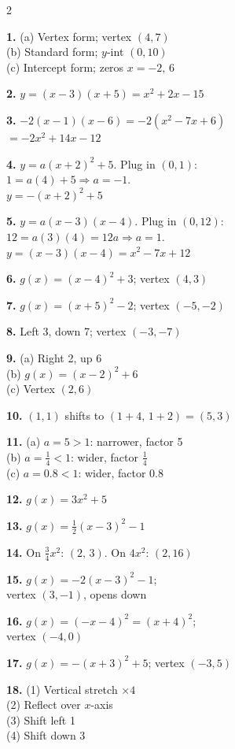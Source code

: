\documentclass[11pt]{article}
\begin{document}
\begin{multicols}{2}

\textbf{1.}
(a) Vertex form; vertex $(4,7)$\\
(b) Standard form; $y$-int $(0,10)$\\
(c) Intercept form; zeros $x=-2,\,6$

\medskip
\textbf{2.} $y=(x-3)(x+5)=x^2+2x-15$

\medskip
\textbf{3.} $-2(x-1)(x-6)=-2(x^2-7x+6)$\\
$= -2x^2+14x-12$

\medskip
\textbf{4.} $y=a(x+2)^2+5$. Plug in $(0,1)$:\\
$1=a(4)+5 \Rightarrow a=-1$.\\
$y=-(x+2)^2+5$

\medskip
\textbf{5.} $y=a(x-3)(x-4)$. Plug in $(0,12)$:\\
$12=a(3)(4)=12a \Rightarrow a=1$.\\
$y=(x-3)(x-4)=x^2-7x+12$

\medskip
\textbf{6.} $g(x)=(x-4)^2+3$; vertex $(4,3)$

\medskip
\textbf{7.} $g(x)=(x+5)^2-2$; vertex $(-5,-2)$

\medskip
\textbf{8.} Left 3, down 7; vertex $(-3,-7)$

\medskip
\textbf{9.} (a) Right 2, up 6\\
(b) $g(x)=(x-2)^2+6$\\
(c) Vertex $(2,6)$

\medskip
\textbf{10.} $(1,1)$ shifts to $(1+4,\,1+2)=(5,3)$

\medskip
\textbf{11.}
(a) $a=5>1$: narrower, factor 5\\
(b) $a=\frac{1}{4}<1$: wider, factor $\frac{1}{4}$\\
(c) $a=0.8<1$: wider, factor $0.8$

\medskip
\textbf{12.} $g(x)=3x^2+5$

\medskip
\textbf{13.} $g(x)=\tfrac{1}{2}(x-3)^2-1$

\medskip
\textbf{14.} On $\tfrac{3}{4}x^2$: $(2,\,3)$. On $4x^2$: $(2,16)$

\medskip
\textbf{15.} $g(x)=-2(x-3)^2-1$;\\ vertex $(3,-1)$, opens down

\medskip
\textbf{16.} $g(x)=(-x-4)^2=(x+4)^2$;\\ vertex $(-4,0)$

\medskip
\textbf{17.} $g(x)=-(x+3)^2+5$; vertex $(-3,5)$

\medskip
\textbf{18.} (1) Vertical stretch $\times 4$\\
(2) Reflect over $x$-axis\\
(3) Shift left 1\\
(4) Shift down 3


\end{multicols}
\end{document}
